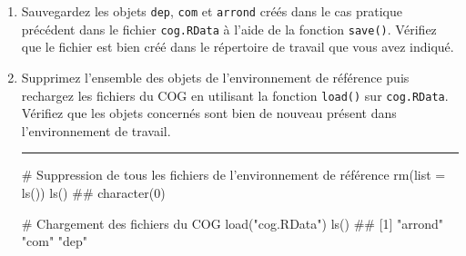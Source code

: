 \documentclass[12pt,twosided, notitlepage]{book}
\newenvironment{Shaded}{}{}
\newcommand{\KeywordTok}[1]{\textcolor[rgb]{0.00,0.00,1.00}{{#1}}}
\newcommand{\DataTypeTok}[1]{{#1}}
\newcommand{\StringTok}[1]{\textcolor[rgb]{0.00,0.50,0.50}{{#1}}}
\newcommand{\CommentTok}[1]{\textcolor[rgb]{0.00,0.50,0.00}{{#1}}}
\newcommand{\NormalTok}[1]{{#1}}
\newif \ifsol
\renewenvironment{Shaded}{\begin{snugshade}}{\end{snugshade}}
\begin{document}
\begin{enumerate}
\def\labelenumi{\alph{enumi}.}
\item
  Sauvegardez les objets \texttt{dep}, \texttt{com} et \texttt{arrond}
  créés dans le cas pratique précédent dans le fichier
  \texttt{cog.RData} à l'aide de la fonction
  \texttt{save()}. Vérifiez que le fichier est bien
  créé dans le répertoire de travail que vous avez indiqué.

  \ifsol 

  \begin{center} \rule{0.5\linewidth}{\linethickness}\end{center}

\begin{Shaded}
\begin{Highlighting}[]
\CommentTok{# Sauvegarde des objets du COG dans cog.RData}
\KeywordTok{save}\NormalTok{(dep, com, arrond, }\DataTypeTok{file =} \StringTok{"cog.RData"}\NormalTok{)}
\end{Highlighting}
\end{Shaded}

  \begin{center} \rule{0.5\linewidth}{\linethickness}\end{center}

  \bigskip  \fi 
\item
  Supprimez l'ensemble des objets de l'environnement de référence puis
  rechargez les fichiers du COG en utilisant la fonction
  \texttt{load()} sur \texttt{cog.RData}. Vérifiez
  que les objets concernés sont bien de nouveau présent dans
  l'environnement de travail.

  \ifsol 

  \begin{center} \rule{0.5\linewidth}{\linethickness}\end{center}

\begin{Shaded}
\begin{Highlighting}[]
\CommentTok{# Suppression de tous les fichiers de l'environnement de référence}
\KeywordTok{rm}\NormalTok{(}\DataTypeTok{list =} \KeywordTok{ls}\NormalTok{())}
\KeywordTok{ls}\NormalTok{()}
  \NormalTok{## character(0)}

\CommentTok{# Chargement des fichiers du COG}
\KeywordTok{load}\NormalTok{(}\StringTok{"cog.RData"}\NormalTok{)}
\KeywordTok{ls}\NormalTok{()}
  \NormalTok{## [1] "arrond" "com"    "dep"}
\end{Highlighting}
\end{Shaded}


\end{enumerate}
\end{document}
